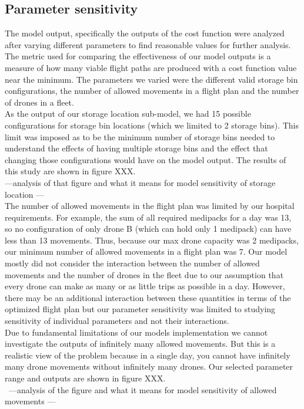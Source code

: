 \documentclass[twocolumn,10pt]{asme2ej}
\begin{document}
\subsection{Parameter sensitivity}
The model output, specifically the outputs of the cost function were analyzed after varying different parameters to find reasonable values for further analysis. The metric used for comparing the effectiveness of our model outputs is a measure of how many viable flight paths are produced with a cost function value near the minimum. The parameters we varied were the different valid storage bin configurations, the number of allowed movements in a flight plan and the number of drones in a fleet. \\
As the output of our storage location sub-model, we had 15 possible configurations for storage bin locations (which we limited to 2 storage bins). This limit was imposed as to be the minimum number of storage bins needed to understand the effects of having multiple storage bins and the effect that changing those configurations would have on the model output. The results of this study are shown in figure XXX. \\
---analysis of that figure and what it means for model sensitivity of storage location --- \\
The number of allowed movements in the flight plan was limited by our hospital requirements. For example, the sum of all required medipacks for a day was 13, so no configuration of only drone B (which can hold only 1 medipack) can have less than 13 movements. Thus, because our max drone capacity was 2 medipacks, our minimum number of allowed movements in a flight plan was 7. Our model mostly did not consider the interaction between the number of allowed movements and the number of drones in the fleet due to our assumption that every drone can make as many or as little trips as possible in a day. However, there may be an additional interaction between these quantities in terms of the optimized flight plan but our parameter sensitivity was limited to studying sensitivity of individual parameters and not their interactions. \\
Due to fundamental limitations of our models implementation we cannot investigate the outputs of infinitely many allowed movements. But this is a realistic view of the problem because in a single day, you cannot have infinitely many drone movements without infinitely many drones. Our selected parameter range and outputs are shown in figure XXX. \\\
---analysis of the figure and what it means for model sensitivity of allowed movements ---
\end{document}
